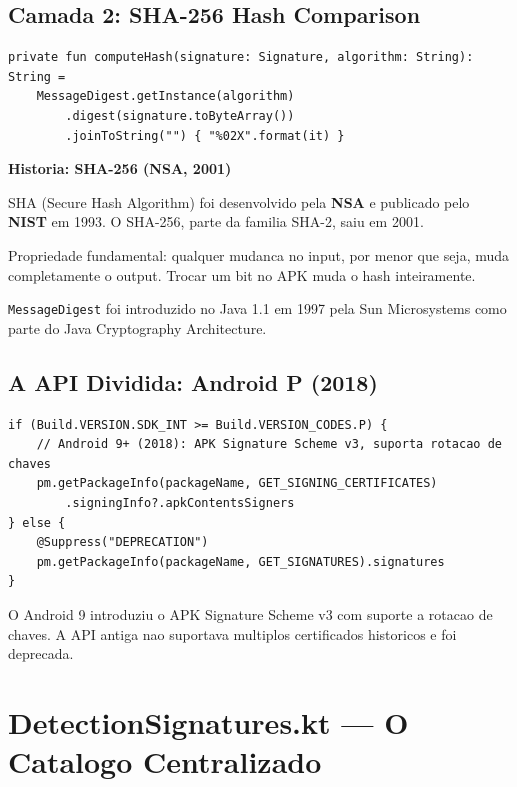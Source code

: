 \documentclass[12pt,a4paper]{article}
\begin{document}
\subsection{Camada 2: SHA-256 Hash Comparison}

\begin{lstlisting}
private fun computeHash(signature: Signature, algorithm: String): String =
    MessageDigest.getInstance(algorithm)
        .digest(signature.toByteArray())
        .joinToString("") { "%02X".format(it) }
\end{lstlisting}

\begin{historybox}
\textbf{Historia: SHA-256 (NSA, 2001)}

SHA (Secure Hash Algorithm) foi desenvolvido pela \textbf{NSA} e publicado
pelo \textbf{NIST} em 1993. O SHA-256, parte da familia SHA-2, saiu em 2001.

Propriedade fundamental: qualquer mudanca no input, por menor que seja,
muda completamente o output. Trocar um bit no APK muda o hash inteiramente.

\texttt{MessageDigest} foi introduzido no Java 1.1 em 1997 pela Sun Microsystems
como parte do Java Cryptography Architecture.
\end{historybox}

\subsection{A API Dividida: Android P (2018)}

\begin{lstlisting}
if (Build.VERSION.SDK_INT >= Build.VERSION_CODES.P) {
    // Android 9+ (2018): APK Signature Scheme v3, suporta rotacao de chaves
    pm.getPackageInfo(packageName, GET_SIGNING_CERTIFICATES)
        .signingInfo?.apkContentsSigners
} else {
    @Suppress("DEPRECATION")
    pm.getPackageInfo(packageName, GET_SIGNATURES).signatures
}
\end{lstlisting}

O Android 9 introduziu o APK Signature Scheme v3 com suporte a rotacao de chaves.
A API antiga nao suportava multiplos certificados historicos e foi deprecada.

\newpage

\section{DetectionSignatures.kt --- O Catalogo Centralizado}
\end{document}

